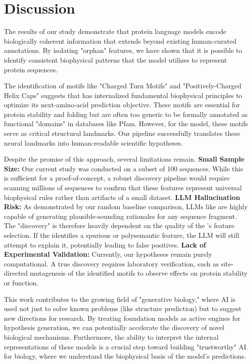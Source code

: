 \section{Discussion}
\label{sec:discussion}

The results of our study demonstrate that protein language models encode biologically coherent information that extends beyond existing human-curated annotations. By isolating "orphan" \sae features, we have shown that it is possible to identify consistent biophysical patterns that the model utilizes to represent protein sequences.

The identification of motifs like "Charged Turn Motifs" and "Positively-Charged Helix Caps" suggests that \esm has internalized fundamental biophysical principles to optimize its next-amino-acid prediction objective. These motifs are essential for protein stability and folding but are often too generic to be formally annotated as functional "domains" in databases like Pfam. However, for the model, these motifs serve as critical structural landmarks. Our pipeline successfully translates these neural landmarks into human-readable scientific hypotheses.

Despite the promise of this approach, several limitations remain.
{\bf Small Sample Size:} Our current study was conducted on a subset of 100 \swissprot sequences. While this is sufficient for a proof-of-concept, a robust discovery pipeline would require scanning millions of sequences to confirm that these features represent universal biophysical rules rather than artifacts of a small dataset.
{\bf LLM Hallucination Risk:} As demonstrated by our random baseline comparison, LLMs like \gpt are highly capable of generating plausible-sounding rationales for any sequence fragment. The "discovery" is therefore heavily dependent on the quality of the \sae's feature selection. If the \sae identifies a spurious or polysemantic feature, the LLM will still attempt to explain it, potentially leading to false positives.
{\bf Lack of Experimental Validation:} Currently, our hypotheses remain purely computational. A true discovery requires laboratory verification, such as site-directed mutagenesis of the identified motifs to observe effects on protein stability or function.

This work contributes to the growing field of "generative biology," where AI is used not just to solve known problems (like structure prediction) but to suggest new directions for research. By treating foundation models as active engines for hypothesis generation, we can potentially accelerate the discovery of novel biological mechanisms. Furthermore, the ability to interpret the internal representations of these models is a crucial step toward building "trustworthy" AI for biology, where we understand the biophysical basis of the model's predictions.
